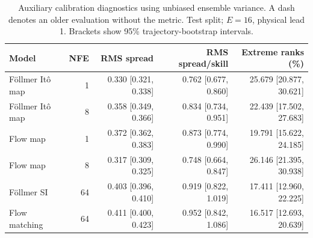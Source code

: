 \begin{table}[t]
\centering
\small
\setlength{\tabcolsep}{3pt}
\caption{Auxiliary calibration diagnostics using unbiased ensemble variance. A dash denotes an older evaluation without the metric. Test split; $E=16$, physical lead 1. Brackets show 95\% trajectory-bootstrap intervals.}
\label{tab:map-rms-calibration}
\begin{tabular}{lrrrr}
\toprule
Model & NFE & RMS spread & RMS spread/skill & Extreme ranks (\%) \\
\midrule
Föllmer Itô map & 1 & 0.330 [0.321, 0.338] & 0.762 [0.677, 0.860] & 25.679 [20.877, 30.621] \\
Föllmer Itô map & 8 & 0.358 [0.349, 0.366] & 0.834 [0.734, 0.951] & 22.439 [17.502, 27.683] \\
\addlinespace
Flow map & 1 & 0.372 [0.362, 0.383] & 0.873 [0.774, 0.990] & 19.791 [15.622, 24.185] \\
Flow map & 8 & 0.317 [0.309, 0.325] & 0.748 [0.664, 0.847] & 26.146 [21.395, 30.938] \\
\addlinespace
Föllmer SI & 64 & 0.403 [0.396, 0.410] & 0.919 [0.822, 1.019] & 17.411 [12.960, 22.225] \\
\addlinespace
Flow matching & 64 & 0.411 [0.400, 0.423] & 0.952 [0.842, 1.086] & 16.517 [12.693, 20.639] \\
\bottomrule
\end{tabular}
\end{table}
